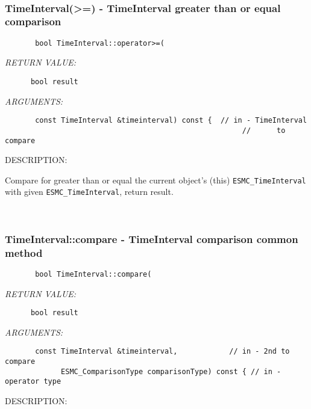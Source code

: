  
\mbox{}\hrulefill\ 
 
\subsubsection [TimeInterval(>=)] {TimeInterval(>=) - TimeInterval greater than or equal comparison}


  
\begin{verbatim}       bool TimeInterval::operator>=(\end{verbatim}{\em RETURN VALUE:}
\begin{verbatim}      bool result\end{verbatim}{\em ARGUMENTS:}
\begin{verbatim}       const TimeInterval &timeinterval) const {  // in - TimeInterval
                                                       //      to compare\end{verbatim}
{\sf DESCRIPTION:\\ }


        Compare for greater than or equal the current object's (this)
        {\tt ESMC\_TimeInterval} with given {\tt ESMC\_TimeInterval},
        return result.
   
 
\mbox{}\hrulefill\
 
\subsubsection [TimeInterval::compare] {TimeInterval::compare - TimeInterval comparison common method}


  
\begin{verbatim}       bool TimeInterval::compare(\end{verbatim}{\em RETURN VALUE:}
\begin{verbatim}      bool result\end{verbatim}{\em ARGUMENTS:}
\begin{verbatim}       const TimeInterval &timeinterval,            // in - 2nd to compare
             ESMC_ComparisonType comparisonType) const { // in - operator type\end{verbatim}
{\sf DESCRIPTION:\\ }


